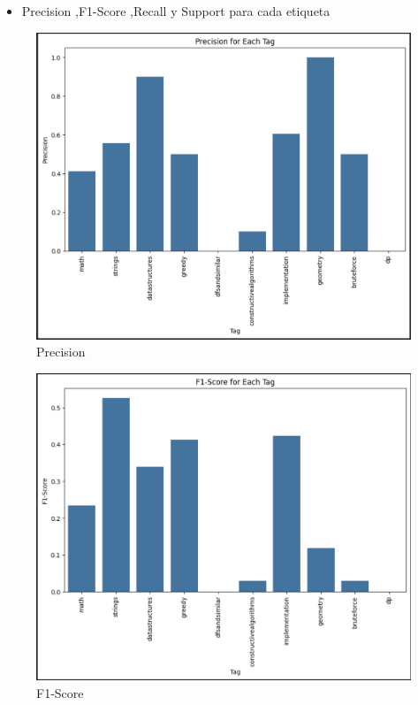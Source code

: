 \documentclass{article}
\begin{document}
\newpage
\begin{itemize}
    \item Precision ,F1-Score ,Recall y Support para cada etiqueta
\end{itemize}
\begin{figure}[H]
    \centering
    \includegraphics[scale=0.49]{imgs/precisonknn.png}
    \caption{Precision}
    \label{fig:p}
\end{figure}
\begin{figure}[H]
    \centering
    \includegraphics[scale=0.49]{imgs/f1knn.png}
    \caption{F1-Score}
    \label{fig:f1}
\end{figure}
\end{document}
